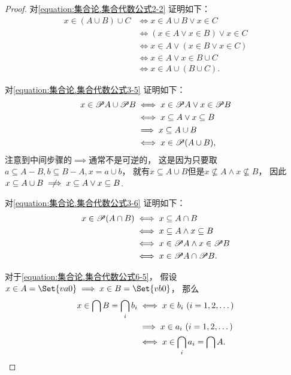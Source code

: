 \begin{property}
\begin{proof}
对\cref{equation:集合论.集合代数公式2-2} 证明如下：
\begin{align*}
	x \in (A \cup B) \cup C
	&\iff x \in A \cup B \lor x \in C \\
	&\iff (x \in A \lor x \in B) \lor x \in C \\
	&\iff x \in A \lor (x \in B \lor x \in C) \\
	&\iff x \in A \lor x \in B \cup C \\
	&\iff x \in A \cup (B \cup C).
\end{align*}

对\cref{equation:集合论.集合代数公式3-5} 证明如下：
\begin{align*}
	x \in \mathscr{P} A \cup \mathscr{P} B
	&\iff x \in \mathscr{P} A \lor x \in \mathscr{P} B \\
	&\iff x \subseteq A \lor x \subseteq B \\
	&\implies x \subseteq A \cup B \\
	&\iff x \in \mathscr{P} (A \cup B),
\end{align*}
注意到中间步骤的\(\implies\)通常不是可逆的，
这是因为只要取\(a \subseteq A - B, b \subseteq B - A, x = a \cup b\)，
就有\(x \subseteq A \cup B\)但是\(x \not\subseteq A \land x \not\subseteq B\)，
因此\(x \subseteq A \cup B \notimplies x \subseteq A \lor x \subseteq B\).

对\cref{equation:集合论.集合代数公式3-6} 证明如下：
\begin{align*}
	x \in \mathscr{P} (A \cap B)
	&\iff x \subseteq A \cap B \\
	&\iff x \subseteq A \land x \subseteq B \\
	&\iff x \in \mathscr{P} A \land x \in \mathscr{P} B \\
	&\iff x \in \mathscr{P} A \cap \mathscr{P} B.
\end{align*}

对于\cref{equation:集合论.集合代数公式6-5}，
假设\(x \in A = \Set{\v{a}{0}} \implies x \in B = \Set{\v{b}{0}}\)，%
那么\begin{align*}
x \in \bigcap B = \bigcap_i b_i
&\iff
	x \in b_i\ (i=1,2,\dotsc) \\
&\implies
	x \in a_i\ (i=1,2,\dotsc) \\
&\iff
	x \in \bigcap_i a_i = \bigcap A.
\qedhere
\end{align*}
\end{proof}
\end{property}


